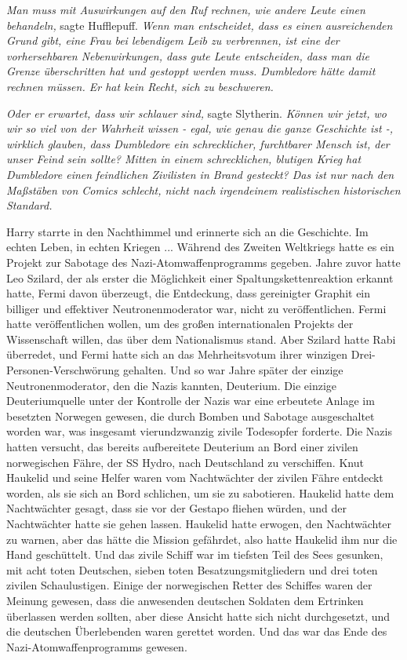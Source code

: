 \emph{Man muss mit Auswirkungen auf den Ruf rechnen, wie andere Leute einen
behandeln,} sagte Hufflepuff. \emph{Wenn man entscheidet, dass es einen
ausreichenden Grund gibt, eine Frau bei lebendigem Leib zu verbrennen, ist eine
der vorhersehbaren Nebenwirkungen, dass gute Leute entscheiden, dass man die
Grenze überschritten hat und gestoppt werden muss. Dumbledore hätte damit
rechnen müssen. Er hat kein Recht, sich zu beschweren.}

\emph{Oder er erwartet, dass wir schlauer sind,} sagte Slytherin. \emph{Können
wir jetzt, wo wir so viel von der Wahrheit wissen - egal, wie genau die ganze
Geschichte ist -, wirklich glauben, dass Dumbledore ein schrecklicher,
furchtbarer Mensch ist, der unser Feind sein sollte? Mitten in einem
schrecklichen, blutigen Krieg hat Dumbledore einen} \emph{feindlichen Zivilisten
in Brand gesteckt? Das ist nur nach den Maßstäben von Comics schlecht, nicht
nach irgendeinem realistischen historischen Standard.}

Harry starrte in den Nachthimmel und erinnerte sich an die Geschichte. Im echten
Leben, in echten Kriegen ... Während des Zweiten Weltkriegs hatte es ein Projekt
zur Sabotage des Nazi-Atomwaffenprogramms gegeben. Jahre zuvor hatte Leo
Szilard, der als erster die Möglichkeit einer Spaltungskettenreaktion erkannt
hatte, Fermi davon überzeugt, die Entdeckung, dass gereinigter Graphit ein
billiger und effektiver Neutronenmoderator war, nicht zu veröffentlichen. Fermi
hatte veröffentlichen wollen, um des großen internationalen Projekts der
Wissenschaft willen, das über dem Nationalismus stand. Aber Szilard hatte Rabi
überredet, und Fermi hatte sich an das Mehrheitsvotum ihrer winzigen
Drei-Personen-Verschwörung gehalten. Und so war Jahre später der einzige
Neutronenmoderator, den die Nazis kannten, Deuterium. Die einzige
Deuteriumquelle unter der Kontrolle der Nazis war eine erbeutete Anlage im
besetzten Norwegen gewesen, die durch Bomben und Sabotage ausgeschaltet worden
war, was insgesamt vierundzwanzig zivile Todesopfer forderte. Die Nazis hatten
versucht, das bereits aufbereitete Deuterium an Bord einer zivilen norwegischen
Fähre, der SS Hydro, nach Deutschland zu verschiffen. Knut Haukelid und seine
Helfer waren vom Nachtwächter der zivilen Fähre entdeckt worden, als sie sich an
Bord schlichen, um sie zu sabotieren. Haukelid hatte dem Nachtwächter gesagt,
dass sie vor der Gestapo fliehen würden, und der Nachtwächter hatte sie gehen
lassen. Haukelid hatte erwogen, den Nachtwächter zu warnen, aber das hätte die
Mission gefährdet, also hatte Haukelid ihm nur die Hand geschüttelt. Und das
zivile Schiff war im tiefsten Teil des Sees gesunken, mit acht toten Deutschen,
sieben toten Besatzungsmitgliedern und drei toten zivilen Schaulustigen. Einige
der norwegischen Retter des Schiffes waren der Meinung gewesen, dass die
anwesenden deutschen Soldaten dem Ertrinken überlassen werden sollten, aber
diese Ansicht hatte sich nicht durchgesetzt, und die deutschen Überlebenden
waren gerettet worden. Und das war das Ende des Nazi-Atomwaffenprogramms
gewesen.

